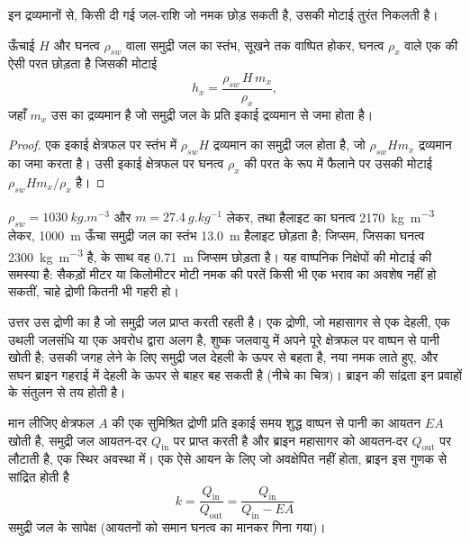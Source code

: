 इन द्रव्यमानों से, किसी दी गई जल-राशि जो नमक छोड़ सकती है, उसकी मोटाई तुरंत निकलती है।

\begin{proposition}[समुद्री जल के स्तंभ से नमक]\label{prop:b1:chemical-biogenic-sediments:column}
ऊँचाई $H$ और घनत्व $\rho_{sw}$ वाला समुद्री जल का स्तंभ, सूखने तक वाष्पित होकर, घनत्व $\rho_x$ वाले एक  की ऐसी परत छोड़ता है जिसकी मोटाई
\[
h_x = \frac{\rho_{sw}\,H\,m_x}{\rho_x},
\]
जहाँ $m_x$ उस  का द्रव्यमान है जो समुद्री जल के प्रति इकाई द्रव्यमान से जमा होता है।
\end{proposition}

\begin{proof}
एक इकाई क्षेत्रफल पर स्तंभ में $\rho_{sw}H$ द्रव्यमान का समुद्री जल होता है, जो $\rho_{sw}Hm_x$ द्रव्यमान का  जमा करता है। उसी इकाई क्षेत्रफल पर घनत्व $\rho_x$ की परत के रूप में फैलाने पर उसकी मोटाई $\rho_{sw}Hm_x/\rho_x$ है।
\end{proof}

$\rho_{sw} = \qty{1030}{kg.m^{-3}}$ और $m = \qty{27.4}{g.kg^{-1}}$ लेकर, तथा हैलाइट का घनत्व \qty{2170}{kg.m^{-3}} लेकर, \qty{1000}{m} ऊँचा समुद्री जल का स्तंभ \qty{13.0}{m} हैलाइट छोड़ता है; जिप्सम, जिसका घनत्व \qty{2300}{kg.m^{-3}} है, के साथ वह \qty{0.71}{m} जिप्सम छोड़ता है। यह वाष्पनिक निक्षेपों की मोटाई की समस्या है: सैकड़ों मीटर या किलोमीटर मोटी नमक की परतें किसी भी एक भराव का अवशेष नहीं हो सकतीं, चाहे द्रोणी कितनी भी गहरी हो।

उत्तर उस द्रोणी का है जो समुद्री जल प्राप्त करती रहती है। एक द्रोणी, जो महासागर से एक देहली, एक उथली जलसंधि या एक अवरोध द्वारा अलग है, शुष्क जलवायु में अपने पूरे क्षेत्रफल पर वाष्पन से पानी खोती है; उसकी जगह लेने के लिए समुद्री जल देहली के ऊपर से बहता है, नया नमक लाते हुए, और सघन ब्राइन गहराई में देहली के ऊपर से बाहर बह सकती है (नीचे का चित्र)। ब्राइन की सांद्रता इन प्रवाहों के संतुलन से तय होती है।

\begin{proposition}[अवरुद्ध द्रोणी]\label{prop:b1:chemical-biogenic-sediments:barred}
मान लीजिए क्षेत्रफल $A$ की एक सुमिश्रित द्रोणी प्रति इकाई समय शुद्ध वाष्पन से पानी का आयतन $EA$ खोती है, समुद्री जल आयतन-दर $Q_{\mathrm{in}}$ पर प्राप्त करती है और ब्राइन महासागर को आयतन-दर $Q_{\mathrm{out}}$ पर लौटाती है, एक स्थिर अवस्था में। एक ऐसे आयन के लिए जो अवक्षेपित नहीं होता, ब्राइन इस गुणक से सांद्रित होती है
\[
k = \frac{Q_{\mathrm{in}}}{Q_{\mathrm{out}}} = \frac{Q_{\mathrm{in}}}{Q_{\mathrm{in}} - EA}
\]
समुद्री जल के सापेक्ष (आयतनों को समान घनत्व का मानकर गिना गया)।
\end{proposition}

